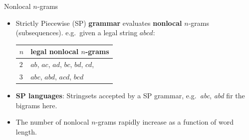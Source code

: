 


\begin{frame}{Nonlocal $n$-grams}
\begin{itemize}
\item Strictly Piecewise (SP) \textbf{grammar} evaluates \textbf{nonlocal} $n$-grams (subsequences).  e.g.\ given a legal string $abcd$:\\
\begin{center}
\begin{tabular}{ll}
        $n$ & legal nonlocal $n$-grams\\\midrule
        $2$ & $ab$, $ac$, $ad$, $bc$, $bd$, $cd$,  \\
        $3$ & $abc$, $abd$, $acd$, $bcd$ \\
\end{tabular}
\end{center}

\item \textbf{SP languages}: Stringsets accepted by a SP grammar, e.g.\ \textit{abc}, \textit{abd} fir the bigrams here.
\item The number of nonlocal $n$-grams rapidly increase as a function of word length.
\end{itemize}


\vspace{-0.3cm}
\hfill\small \citep{gouskova2019inducing}
\end{frame}

